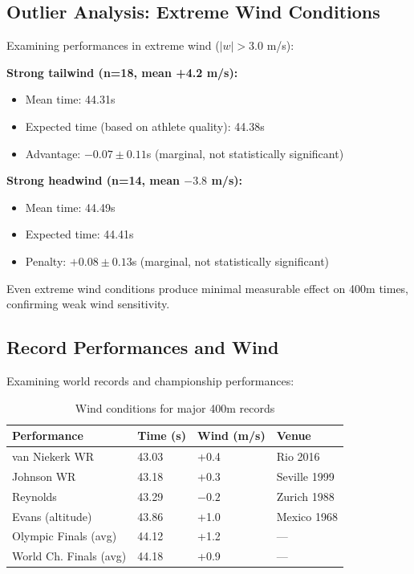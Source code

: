 \subsection{Outlier Analysis: Extreme Wind Conditions}

Examining performances in extreme wind ($|w| > 3.0$ m/s):

\textbf{Strong tailwind (n=18, mean +4.2 m/s):}
\begin{itemize}
    \item Mean time: 44.31s
    \item Expected time (based on athlete quality): 44.38s
    \item Advantage: $-0.07 \pm 0.11$s (marginal, not statistically significant)
\end{itemize}

\textbf{Strong headwind (n=14, mean $-3.8$ m/s):}
\begin{itemize}
    \item Mean time: 44.49s
    \item Expected time: 44.41s
    \item Penalty: $+0.08 \pm 0.13$s (marginal, not statistically significant)
\end{itemize}

Even extreme wind conditions produce minimal measurable effect on 400m times, confirming weak wind sensitivity.

\subsection{Record Performances and Wind}

Examining world records and championship performances:

\begin{table}[H]
\centering
\caption{Wind conditions for major 400m records}
\begin{tabular}{@{}llll@{}}
\toprule
\textbf{Performance} & \textbf{Time (s)} & \textbf{Wind (m/s)} & \textbf{Venue} \\
\midrule
van Niekerk WR & 43.03 & +0.4 & Rio 2016 \\
Johnson WR & 43.18 & +0.3 & Seville 1999 \\
Reynolds & 43.29 & $-0.2$ & Zurich 1988 \\
Evans (altitude) & 43.86 & +1.0 & Mexico 1968 \\
\midrule
Olympic Finals (avg) & 44.12 & +1.2 & — \\
World Ch. Finals (avg) & 44.18 & +0.9 & — \\
\bottomrule
\end{tabular}
\end{table}

